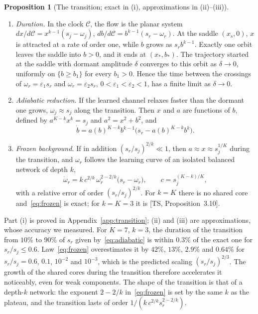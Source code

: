 \documentclass[11pt]{article}
\newcommand{\TS}{\textsf{TS}}
\newcommand{\ts}[1]{[\TS, #1]}
\newcommand{\Clk}{\mathcal{C}}
\theoremstyle{definition}
\newtheorem{proposition}[theorem]{Proposition}
\numberwithin{equation}{section}
\begin{document}
\begin{proposition}[The transition; exact in (i), approximations in (ii)--(iii)]\label{prop:transition}
\leavevmode
\begin{enumerate}[label=(\roman*),nosep]
\item \emph{Duration.} In the clock $\Clk$, the flow is the planar system $dx/d\Clk=x^{k-1}(s_j-\omega_j)$, $db/d\Clk=b^{k-1}(s_r-\omega_r)$. At the saddle $(x_s,0)$, $x$ is attracted at a rate of order one, while $b$ grows as $s_rb^{k-1}$. Exactly one orbit leaves the saddle into $b>0$, and it ends at $(x_*,b_*)$. The trajectory started at the saddle with dormant amplitude $\delta$ converges to this orbit as $\delta\to0$, uniformly on $\{b\ge b_1\}$ for every $b_1>0$. Hence the time between the crossings of $\omega_r=\varepsilon_1s_r$ and $\omega_r=\varepsilon_2s_r$, $0<\varepsilon_1<\varepsilon_2<1$, has a finite limit as $\delta\to0$.
\item \emph{Adiabatic reduction.} If the learned channel relaxes faster than the dormant one grows, $\omega_j\approx s_j$ along the transition. Then $x$ and $a$ are functions of $b$, defined by $a^{K-k}x^k=s_j$ and $a^2=x^2+b^2$, and
\begin{equation}\label{eq:adiabatic}
\dot b=a(b)^{K-k}b^{k-1}\big(s_r-a(b)^{K-k}b^k\big).
\end{equation}
\item \emph{Frozen background.} If in addition $(s_r/s_j)^{2/k}\ll1$, then $a\approx x\approx s_j^{1/K}$ during the transition, and $\omega_r$ follows the learning curve of an isolated balanced network of depth $k$,
\begin{equation}\label{eq:frozen}
\dot\omega_r=k\,c^{2/k}\,\omega_r^{2-2/k}\big(s_r-\omega_r\big),\qquad c=s_j^{(K-k)/K},
\end{equation}
with a relative error of order $(s_r/s_j)^{2/k}$. For $k=K$ there is no shared core and~\eqref{eq:frozen} is exact; for $k=K=3$ it is \ts{Proposition~3.10}.
\end{enumerate}
\end{proposition}

Part (i) is proved in Appendix~\ref{app:transition}; (ii) and (iii) are approximations, whose accuracy we measured. For $K=7$, $k=3$, the duration of the transition from $10\%$ to $90\%$ of $s_r$ given by~\eqref{eq:adiabatic} is within $0.3\%$ of the exact one for $s_r/s_j\le0.6$. Law~\eqref{eq:frozen} overestimates it by $42\%$, $13\%$, $2.9\%$ and $0.64\%$ for $s_r/s_j=0.6$, $0.1$, $10^{-2}$ and $10^{-3}$, which is the predicted scaling $(s_r/s_j)^{2/3}$. The growth of the shared cores during the transition therefore accelerates it noticeably, even for weak components. The shape of the transition is that of a depth-$k$ network: the exponent $2-2/k$ in~\eqref{eq:frozen} is set by the same $k$ as the plateau, and the transition lasts of order $1/(k\,c^{2/k}s_r^{2-2/k})$.
\end{document}
